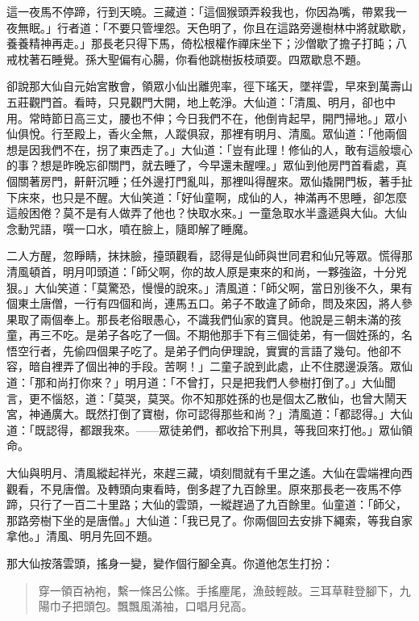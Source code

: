 這一夜馬不停蹄，行到天曉。三藏道：「這個猴頭弄殺我也，你因為嘴，帶累我一夜無眠。」行者道：「不要只管埋怨。天色明了，你且在這路旁邊樹林中將就歇歇，養養精神再走。」那長老只得下馬，倚松根權作禪床坐下；沙僧歇了擔子打盹；八戒枕著石睡覺。孫大聖偏有心腸，你看他跳樹扳枝頑耍。四眾歇息不題。

卻說那大仙自元始宮散會，領眾小仙出離兜率，徑下瑤天，墜祥雲，早來到萬壽山五莊觀門首。看時，只見觀門大開，地上乾淨。大仙道：「清風、明月，卻也中用。常時節日高三丈，腰也不伸；今日我們不在，他倒肯起早，開門掃地。」眾小仙俱悅。行至殿上，香火全無，人蹤俱寂，那裡有明月、清風。眾仙道：「他兩個想是因我們不在，拐了東西走了。」大仙道：「豈有此理！修仙的人，敢有這般壞心的事？想是昨晚忘卻關門，就去睡了，今早還未醒哩。」眾仙到他房門首看處，真個關著房門，鼾鼾沉睡；任外邊打門亂叫，那裡叫得醒來。眾仙撬開門板，著手扯下床來，也只是不醒。大仙笑道：「好仙童啊，成仙的人，神滿再不思睡，卻怎麼這般困倦？莫不是有人做弄了他也？快取水來。」一童急取水半盞遞與大仙。大仙念動咒語，噀一口水，噴在臉上，隨即解了睡魔。

二人方醒，忽睜睛，抹抹臉，擡頭觀看，認得是仙師與世同君和仙兄等眾。慌得那清風頓首，明月叩頭道：「師父啊，你的故人原是東來的和尚，一夥強盜，十分兇狠。」大仙笑道：「莫驚恐，慢慢的說來。」清風道：「師父啊，當日別後不久，果有個東土唐僧，一行有四個和尚，連馬五口。弟子不敢違了師命，問及來因，將人參果取了兩個奉上。那長老俗眼愚心，不識我們仙家的寶貝。他說是三朝未滿的孩童，再三不吃。是弟子各吃了一個。不期他那手下有三個徒弟，有一個姓孫的，名悟空行者，先偷四個果子吃了。是弟子們向伊理說，實實的言語了幾句。他卻不容，暗自裡弄了個出神的手段。苦啊！」二童子說到此處，止不住腮邊淚落。眾仙道：「那和尚打你來？」明月道：「不曾打，只是把我們人參樹打倒了。」大仙聞言，更不惱怒，道：「莫哭，莫哭。你不知那姓孫的也是個太乙散仙，也曾大鬧天宮，神通廣大。既然打倒了寶樹，你可認得那些和尚？」清風道：「都認得。」大仙道：「既認得，都跟我來。——眾徒弟們，都收拾下刑具，等我回來打他。」眾仙領命。

大仙與明月、清風縱起祥光，來趕三藏，頃刻間就有千里之遙。大仙在雲端裡向西觀看，不見唐僧。及轉頭向東看時，倒多趕了九百餘里。原來那長老一夜馬不停蹄，只行了一百二十里路；大仙的雲頭，一縱趕過了九百餘里。仙童道：「師父，那路旁樹下坐的是唐僧。」大仙道：「我已見了。你兩個回去安排下繩索，等我自家拿他。」清風、明月先回不題。

那大仙按落雲頭，搖身一變，變作個行腳全真。你道他怎生打扮：
\begin{quote}
穿一領百衲袍，繫一條呂公絛。手搖麈尾，漁鼓輕敲。三耳草鞋登腳下，九陽巾子把頭包。飄飄風滿袖，口唱月兒高。
\end{quote}

